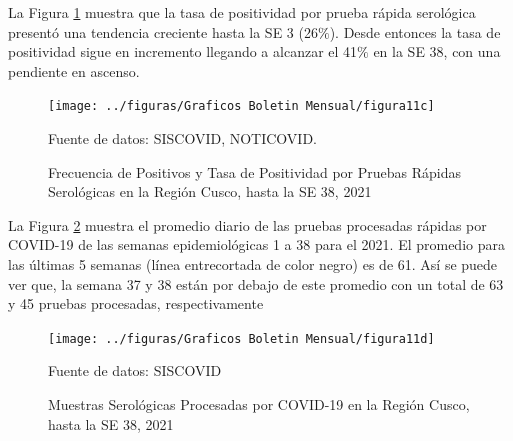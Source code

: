 \documentclass[12pt,a4paper,openany]{book}
\begin{document}
	La Figura \ref{fig:positivos_serologia} muestra que la tasa de positividad por prueba rápida serológica presentó una tendencia creciente hasta la SE 3 (26$\%$). Desde entonces la tasa de positividad sigue en incremento llegando a alcanzar el 41$\%$ en la SE 38, con una pendiente en ascenso.

	\begin{figure}[h]
	\caption{Frecuencia de Positivos y Tasa de Positividad por Pruebas Rápidas Serológicas en la Región Cusco, hasta la SE 38, 2021   }\label{fig:positivos_serologia}
	\begin{center}
		\texttt{[image: ../figuras/Graficos Boletin Mensual/figura11c]}
	\end{center}
	{\footnotesize {Fuente de datos: SISCOVID, NOTICOVID.}}
	\end{figure}
 
	La Figura \ref{fig:procesadas_serologia} muestra el promedio diario de las pruebas procesadas rápidas por COVID-19 de las semanas epidemiológicas 1 a 38 para el 2021. El promedio para las últimas 5 semanas (línea 	entrecortada de color negro) es de 61. Así se puede ver que, la semana 37 y 38 están por debajo de este promedio con un total de 63 y 45 pruebas procesadas, respectivamente

	\begin{figure}[h]
	\caption{Muestras Serológicas Procesadas por COVID-19 en la Región Cusco, hasta la SE 38, 2021}\label{fig:procesadas_serologia}
	\begin{center}
		\texttt{[image: ../figuras/Graficos Boletin Mensual/figura11d]}
	\end{center}
	{\footnotesize {Fuente de datos: SISCOVID}}
	\end{figure}
\end{document}
